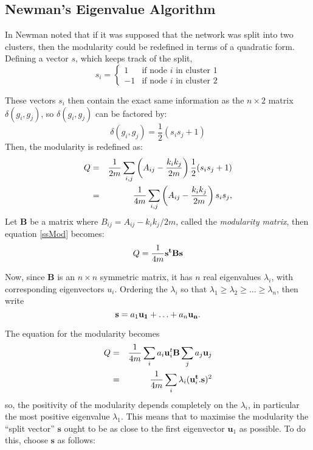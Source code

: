 \subsection{Newman's Eigenvalue Algorithm}

In \cite{Newman2006a} Newman noted that if it was supposed that the network was 
split into two clusters, then the modularity could be redefined in terms of a
quadratic form.  Defining a vector $s$, which keeps track of the
split,
\begin{equation}
s_i = \left\{ \begin{array}{ll} 1 & \mbox{if node $i$ in cluster 1}
  \\ -1 & \mbox{if node $i$ in cluster 2}\end{array} \right.
\end{equation}

These vectors $s_i$ then contain the exact same information as the $n\times 2$ matrix $\delta (g_i,g_j)$, so $\delta (g_i,g_j) $ can be factored by:
\begin{equation}
\delta (g_i,g_j) = \frac{1}{2} \left( s_i s_j + 1 \right)
\end{equation}
Then, the modularity is redefined as:
\begin{eqnarray} \label{ssMod}
Q & = & \frac{1}{2m}\sum_{i,j} \left(A_{ij} - \frac{k_ik_j}{2m}\right)\frac{1}{2}(s_is_j + 1)\cr
& = &\frac{1}{4m}\sum_{i,j} \left(A_{ij} - \frac{k_ik_j}{2m}\right)s_is_j,
\end{eqnarray}
Let $\mathbf{B}$ be a matrix where 
$B_{ij} = A_{ij} - k_ik_j/2m$, called the \emph{modularity matrix}, 
then equation \ref{ssMod} becomes:
\begin{equation}
Q = \frac{1}{4m}{\bf s^tBs}
\end{equation}

Now, since $\mathbf{B}$ is an $n\times n$ symmetric matrix, it has $n$ real eigenvalues $\lambda_i$, with corresponding
eigenvectors $u_i$.  Ordering the $\lambda_i$ so that $
\lambda_1 \geq \lambda_2 \geq \ldots \geq \lambda_n$, then write 
\begin{equation}
{\bf s} = a_1{\bf u_1}+ \ldots + a_n{\bf u_n}.
\end{equation}


The equation for the modularity becomes
\begin{eqnarray}
Q & = & \frac{1}{4m} \sum_{i} a_i{\bf u}_i^t{\bf B}\sum_ja_j{\bf u}_j\cr
& = & \frac{1}{4m} \sum_i \lambda_i ({\bf u}_i^{\bf t}.{\bf s})^2
\end{eqnarray}
so, the positivity of the modularity depends completely on the $\lambda_i$, in 
particular the most positive eigenvalue $\lambda_1$.  This means that to 
maximise the modularity the ``split vector'' $\mathbf{s}$ ought to be 
as close to the first eigenvector $\mathbf{u}_1$ as possible. To do this, 
choose $\mathbf{s}$ as follows:

